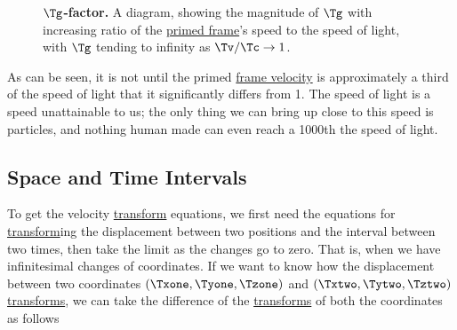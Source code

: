 \begin{figure}[H]
	\centering
	\caption{$\boldsymbol{\Tg }$\textbf{-factor.} A diagram, showing the magnitude of $\Tg $ with increasing ratio of the \protect\hyperlink{def-Primed-Frame}{primed frame}'s speed to the speed of light, with ${\Tg }$ tending to infinity as ${\Tv }/{\Tc }\rightarrow 1$.}
	\label{fig: Gamma Factor}
\end{figure}

As can be seen, it is not until the primed \hyperlink{def-frame-velocity}{frame velocity} is approximately a third of the speed of light that it significantly differs from 1.
The speed of light is a speed unattainable to us; the only thing we can bring up close to this speed is particles, and nothing human made can even reach a 1000th the speed of light.

\subsection{Space and Time Intervals} \label{subsect: Space and Time Intervals}

To get the velocity \hyperlink{def-transform}{transform} equations, we first need the equations for \hyperlink{def-transform}{transform}ing the displacement between two positions and the interval between two times, then take the limit as the changes go to zero.
That is, when we have infinitesimal changes of coordinates.
If we want to know how the displacement between two coordinates $(\Txone ,\Tyone ,\Tzone )$ and $(\Txtwo ,\Tytwo ,\Tztwo )$ \hyperlink{def-transform}{transforms}, we can take the difference of the \hyperlink{def-transform}{transforms} of both the coordinates as follows

